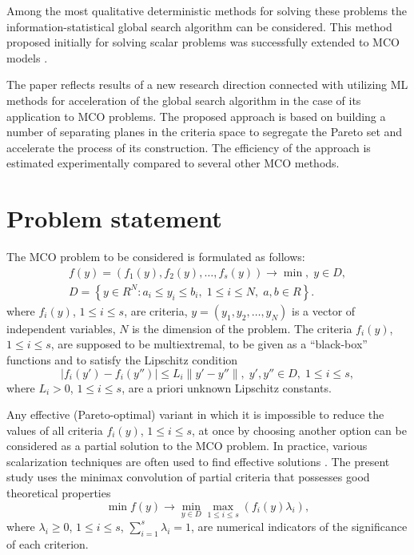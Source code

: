\documentclass[runningheads]{llncs}
\begin{document}
Among the most qualitative deterministic methods for solving these problems the information-statistical global search algorithm \cite{Sergeyev2013,Strongin2000} can be considered. This method proposed initially for solving scalar problems was successfully extended to MCO models \cite{GergelKozinovAPI2016,Gergel2018}.

The paper reflects results of a new research direction connected with utilizing ML methods for acceleration of the global search algorithm in the case of its application to MCO problems. The proposed approach is based on building a number of separating planes in the criteria space to segregate the Pareto set and accelerate the process of its construction. The efficiency of the approach is estimated experimentally compared to several other MCO methods.


\section{Problem statement}

The MCO problem to be considered is formulated as follows:
\begin{gather}
f(y)=(f_1 (y),f_2 (y),\dots ,f_s (y)) \to \min, \; y\in D,  \label{eq:1} \\ 
D=\left\{ y \in R^N: a_i \leq y_i \leq b_i, \; 1 \leq i \leq N, \; a,b \in R \right\}.\label{eq:2} 
\end{gather}
where $f_i (y)$, $1 \leq i \leq s$, are  criteria, $y=(y_1,y_2, \dots,y_N)$ is a vector of independent variables, $N$ is the dimension of the problem. The criteria $f_i (y)$, $1 \leq i \leq s$, are supposed to be multiextremal, to be given as a ``black-box'' functions and to satisfy the Lipschitz condition
\begin{equation}
|f_i (y')-f_i (y'')| \leq L_i \|y'-y''\|, \; y',y'' \in D, \; 1 \leq i \leq s,
\label{eq:3}
\end{equation}
where $L_i>0$, $1 \leq i \leq s$, are a priori unknown Lipschitz constants.

Any effective (Pareto-optimal) variant  in which it is impossible to reduce the values of all criteria $f_i (y)$, $1 \leq i \leq s$, at once by choosing another option   can be considered as a partial solution to the MCO problem. In practice, various scalarization techniques are often used to find effective solutions \cite{Ehrgott2005,GergelKozinov2020,Marler2004,Pardalos2017}. The present study uses the minimax convolution of partial criteria that possesses good theoretical properties
\begin{equation}
\min{f(y)} \to \min_{y\in D}{\max_{1 \leq i \leq s}{(f_i (y) \lambda_i )}} ,
\label{eq:4}
\end{equation}
where $\lambda_i \geq 0$, $1 \leq i \leq s$, $\sum_{i=1}^s{\lambda_i}=1$, are numerical indicators of the significance of each criterion. 
\end{document}
